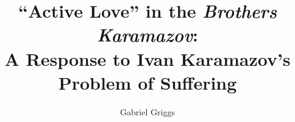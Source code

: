 \documentclass[12pt]{report}
\begin{document}
    
       \graduationmonth{}
       \graduationyear{}
       \author{Gabriel Griggs}
       \committee{}{}{}{}{}
       \title{``Active Love'' in the \emph{Brothers Karamazov}: \\ A Response to Ivan Karamazov's Problem of Suffering}


          \titlepage


\begin{acknowledgements}

     

\end{acknowledgements}
\end{document}
